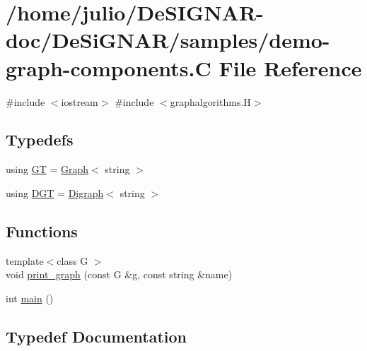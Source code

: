 \hypertarget{demo-graph-components_8_c}{}\section{/home/julio/\+De\+S\+I\+G\+N\+A\+R-\/doc/\+De\+Si\+G\+N\+A\+R/samples/demo-\/graph-\/components.C File Reference}
\label{demo-graph-components_8_c}
{\ttfamily \#include $<$iostream$>$}\newline
{\ttfamily \#include $<$graphalgorithms.\+H$>$}\newline
\subsection*{Typedefs}
\begin{DoxyCompactItemize}
\item 
using \hyperlink{demo-graph-components_8_c_a668102de43ec3f9488fff7b515d48859}{GT} = \hyperlink{class_designar_1_1_graph}{Graph}$<$ string $>$
\item 
using \hyperlink{demo-graph-components_8_c_a8f123599e859454680bf37e203c0b18b}{D\+GT} = \hyperlink{class_designar_1_1_digraph}{Digraph}$<$ string $>$
\end{DoxyCompactItemize}
\subsection*{Functions}
\begin{DoxyCompactItemize}
\item 
{\footnotesize template$<$class G $>$ }\\void \hyperlink{demo-graph-components_8_c_af4aa6ad85cbef3cd03726e2b31004df6}{print\+\_\+graph} (const G \&g, const string \&name)
\item 
int \hyperlink{demo-graph-components_8_c_ae66f6b31b5ad750f1fe042a706a4e3d4}{main} ()
\end{DoxyCompactItemize}


\subsection{Typedef Documentation}
\mbox{\label{demo-graph-components_8_c_a8f123599e859454680bf37e203c0b18b}} 
